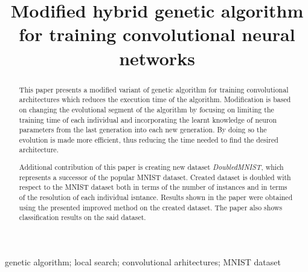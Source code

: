 \documentclass[eng]{simposium}
\begin{document}
\begin{frontmatter}

\title{Modified hybrid genetic algorithm for training convolutional neural networks}

\author{\textbf{ }}
\address{University of Belgrade, Faculty of Mathematics, Studentski trg 16, 11000 Belgrade\\
}
\author{\textbf{ }}
\address{Microsoft Development Center Serbia, Španskih boraca 3, 11000 Belgraed\\
}
\author{\textbf{ }}
\address{University of Belgrade, Faculty of Mathematics, Studentski trg 16, 11000 Belgrade\\
}


\maketitle
\begin{abstract}

This paper presents a modified variant of genetic algorithm for training convolutional architectures which reduces the execution time of the algorithm. 
Modification is based on changing the evolutional segment of the algorithm by focusing on limiting the training time of each individual and incorporating the 
learnt knowledge of neuron parameters from the last generation into each new generation. By doing so the evolution is made more efficient, thus reducing the time 
needed to find the desired architecture.

Additional contribution of this paper is creating new dataset \textit{DoubledMNIST}, which represents a successor of the popular MNIST dataset.
Created dataset is doubled with respect to the MNIST dataset both in terms of the number of instances and in terms of the resolution of each individual isntance.
Results shown in the paper were obtained using the presented improved method on the created dataset. The paper also shows classification results on the said dataset.
\end{abstract}

\begin{keyword}
genetic algorithm; local search; convolutional arhitectures; MNIST dataset
\end{keyword}
\end{frontmatter}
\end{document}
